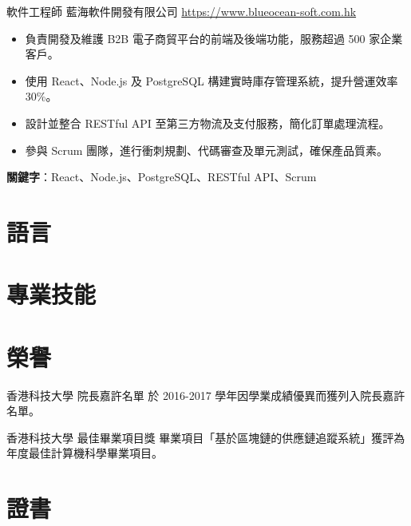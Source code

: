\documentclass[a4paper, serif, 10pt]{moderncv}
\begin{document}
        {軟件工程師}
        {藍海軟件開發有限公司}
        {\url{https://www.blueocean-soft.com.hk}}
        {}
        {\begin{itemize}
\item 負責開發及維護 B2B 電子商貿平台的前端及後端功能，服務超過 500 家企業客戶。
\item 使用 React、Node.js 及 PostgreSQL 構建實時庫存管理系統，提升營運效率 30\%。
\item 設計並整合 RESTful API 至第三方物流及支付服務，簡化訂單處理流程。
\item 參與 Scrum 團隊，進行衝刺規劃、代碼審查及單元測試，確保產品質素。
\end{itemize}
\textbf{關鍵字}：React、Node.js、PostgreSQL、RESTful API、Scrum}
\section{語言}

\section{專業技能}

\section{榮譽}

        {香港科技大學}
        {院長嘉許名單}
        {}
        {}
        {於 2016-2017 學年因學業成績優異而獲列入院長嘉許名單。}

        {香港科技大學}
        {最佳畢業項目獎}
        {}
        {}
        {畢業項目「基於區塊鏈的供應鏈追蹤系統」獲評為年度最佳計算機科學畢業項目。}
\section{證書}
\end{document}
